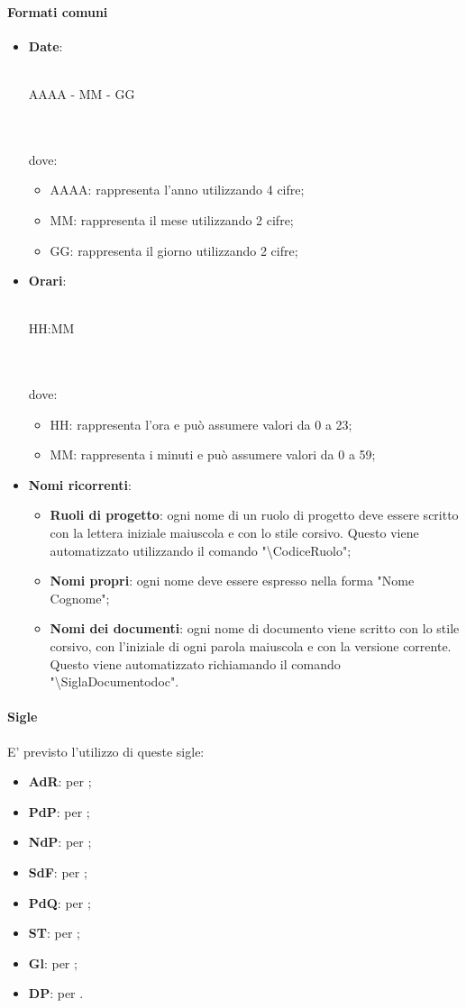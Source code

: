  \paragraph{Formati comuni}
\begin{itemize}
	\item \textbf{Date}:\\ \\ \centerline{AAAA - MM - GG} \\ \\
	dove:
	\begin{itemize}
		\item AAAA: rappresenta l'anno utilizzando 4 cifre;
		\item MM: rappresenta il mese utilizzando 2 cifre;
		\item GG: rappresenta il giorno utilizzando 2 cifre;
	\end{itemize}
	\item \textbf{Orari}:\\ \\ \centerline{HH:MM} \\ \\dove:
	\begin{itemize}
		\item HH: rappresenta l'ora e può assumere valori da 0 a 23;
		\item MM: rappresenta i minuti e può assumere valori da 0 a 59;
	\end{itemize}
	\item \textbf{Nomi ricorrenti}:
	\begin{itemize}
		\item \textbf{Ruoli di progetto}: ogni nome di un ruolo di progetto deve essere scritto con la lettera iniziale maiuscola e con lo stile corsivo. Questo viene automatizzato utilizzando il comando "\textbackslash{CodiceRuolo}";
		\item \textbf{Nomi propri}: ogni nome deve essere espresso nella forma "Nome Cognome";
		\item \textbf{Nomi dei documenti}: ogni nome di documento viene scritto con lo stile corsivo, con l'iniziale di ogni parola maiuscola e con la versione corrente. Questo viene automatizzato richiamando il comando "\textbackslash{SiglaDocumentodoc}".
	\end{itemize}
\end{itemize}
 \paragraph{Sigle}
E' previsto l'utilizzo di queste sigle:
\begin{itemize}
	\item \textbf{AdR}: per \ARdoc;
	\item \textbf{PdP}: per \PPdoc;
	\item \textbf{NdP}: per \NPdoc;
	\item \textbf{SdF}: per \SFdoc;
	\item \textbf{PdQ}: per \PQdoc;
	\item \textbf{ST}: per \STdoc;
	\item \textbf{Gl}: per \Gldoc;
	\item \textbf{DP}: per \DPdoc.		
\end{itemize}
 
